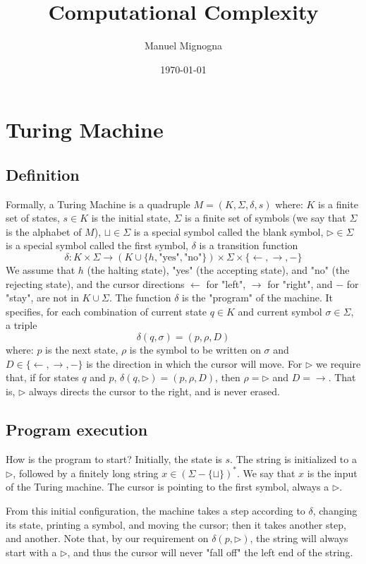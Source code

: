 \documentclass[12pt]{article}
\title{Computational Complexity}
\author{Manuel Mignogna}
\date{\today}
\newcommand{\tr}{\triangleright}
\newcommand{\blank}{\sqcup}
\newcommand{\ra}{\rightarrow}
\newcommand{\la}{\leftarrow}
\begin{document}
\maketitle
\tableofcontents
\newpage

\section{Turing Machine}
\subsection{Definition}
Formally, a Turing Machine is a quadruple $M=(K,\Sigma,\delta,s)$ where: $K$ is a finite set of states, $s\in K$ is the initial state, $\Sigma$ is a finite set of symbols (we say that $\Sigma$ is the alphabet of $M$), $\blank\in\Sigma$ is a special symbol called the blank symbol, $\tr\in\Sigma$ is a special symbol called the first symbol, $\delta$ is a transition function $$\delta : K\times\Sigma
 \to (K\cup\{h,\text{"yes"},\text{"no"}\})\times\Sigma\times\{\la,\ra,-\}$$
We assume that $h$ (the halting state), "yes" (the accepting state), and "no" (the rejecting state), and the cursor directions $\la$ for "left", $\ra$ for "right", and $-$ for "stay", are not in $K\cup\Sigma$.
The function $\delta$ is the "program" of the machine. It specifies, for each combination of current state $q\in K$ and current symbol $\sigma\in\Sigma$, a triple $$\delta(q,\sigma)= (p,\rho,D)$$ where: $p$ is the next state, $\rho$ is the symbol to be written on $\sigma$ and $D\in\{\la,\ra,-\}$  is the direction in which the cursor will move. For $\tr$ we require that, if for states $q$ and $p$, $\delta(q,\tr)=(p,\rho,D)$, then $\rho=\tr$ and $D=\ra$. That is, $\tr$ always directs the cursor to the right, and is never erased.

\subsection{Program execution}
How is the program to start? Initially, the state is $s$. The string is initialized to a $\tr$, followed by a finitely long string $x \in (\Sigma - \{\blank\})^*$. We say that $x$ is the input of the Turing machine. The cursor is pointing to the first symbol, always a $\tr$.

From this initial configuration, the machine takes a step according to $\delta$, changing its state, printing a symbol, and moving the cursor; then it takes another step, and another. Note that, by our requirement on $\delta(p, \tr)$, the string will always start with a $\tr$, and thus the cursor will never "fall off" the left end of the string.
\end{document}
